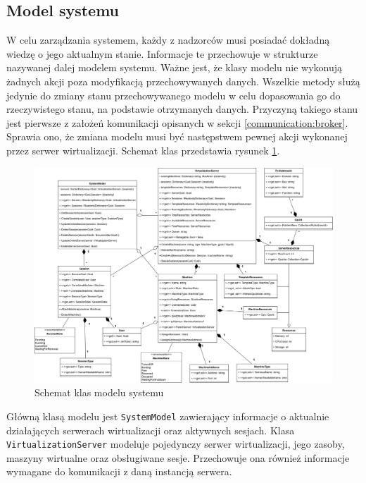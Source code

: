 \documentclass[../opis-rozwiazania.tex]{subfiles}
\begin{document}
\subsection{Model systemu}

W celu zarządzania systemem, każdy z nadzorców musi posiadać dokładną wiedzę o jego aktualnym stanie. Informacje te przechowuje w strukturze nazywanej dalej modelem systemu. Ważne jest, że klasy modelu nie wykonują żadnych akcji poza modyfikacją przechowywanych danych. Wszelkie metody służą jedynie do zmiany stanu przechowywanego modelu w celu dopasowania go do rzeczywistego stanu, na podstawie otrzymanych danych. Przyczyną takiego stanu jest pierwsze z założeń komunikacji opisanych w sekcji \ref{communication:broker}. Sprawia ono, że zmiana modelu musi być następstwem pewnej akcji wykonanej przez serwer wirtualizacji. Schemat klas przedstawia rysunek \ref{figure:architecture:model}.

\begin{figure}[h]
      \centering
      \includegraphics[width=\textwidth]{../diagrams/class_diagrams/system_model_v2.png}
      \caption{Schemat klas modelu systemu}
      \label{figure:architecture:model}
\end{figure}

Główną klasą modelu jest \texttt{SystemModel} zawierający informacje o aktualnie działających serwerach wirtualizacji oraz aktywnych sesjach. Klasa \texttt{VirtualizationServer} modeluje pojedynczy serwer wirtualizacji, jego zasoby, maszyny wirtualne oraz obsługiwane sesje. Przechowuje ona również informacje wymagane do komunikacji z daną instancją serwera.
\end{document}
